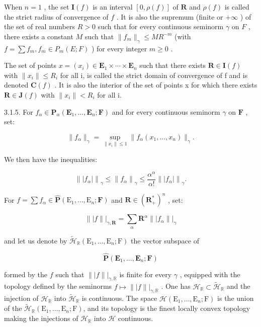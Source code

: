 When \(n=1\) , the set \(\mathbf{I}(f)\) is an interval \([0,\rho(f)]\) of \(\mathbf{R}\) and \(\rho(f)\) is called the strict radius of convergence of \(f\) . It is also the supremum (finite or \(+\infty\) ) of the set of real numbers \(R>0\) such that for every continuous seminorm \(\gamma\) on \(F\) , there exists a constant \(M\) such that \(\|f_{m}\|_{\gamma}\leqslant MR^{-m}\) (with \(f=\sum f_{m},f_{m}\in P_{m}(E;F)\) ) for every integer \(m\geqslant0\) .

The set of points \(x = (x_i) \in \mathbf{E}_1 \times \cdots \times \mathbf{E}_n\) such that there exists \(\mathbf{R} \in \mathbf{I}(f)\) with \(\|x_i\| \leqslant R_i\) for all i, is called the strict domain of convergence of f and is denoted \(\mathbf{C}(f)\) . It is also the interior of the set of points x for which there exists \(\mathbf{R} \in \mathbf{J}(f)\) with \(\|x_i\| < R_i\) for all i.

3.1.5. For \(f_{\alpha} \in \mathbf{P}_{\alpha}(\mathbf{E}_1, \ldots, \mathbf{E}_n; \mathbf{F})\) and for every continuous seminorm \(\gamma\) on \(\mathbf{F}\) , set:

\[
\| f _ {\alpha} \| _ {\gamma} = \sup _ {\| x _ {i} \| \leqslant 1} \| f _ {\alpha} (x _ {1}, \dots , x _ {n}) \| _ {\gamma}.
\]

We then have the inequalities:

\[
\left\| \left| f _ {\alpha} \right| \right\| _ {\gamma} \leqslant \left\| f _ {\alpha} \right\| _ {\gamma} \leqslant \frac {\alpha^ {\alpha}}{\alpha !} \left\| \left| f _ {\alpha} \right| \right\| _ {\gamma}.
\]

For \(f = \sum f_{\alpha} \in \hat{\mathbf{P}}(\mathrm{E}_1, \ldots, \mathrm{E}_n; \mathbf{F})\) and \(\mathbf{R} \in (\mathbf{R}_{+}^{*})^n\) , set:

\[
\| | f \| | _ {\gamma , \mathbf {R}} = \sum_ {\alpha} \mathbf {R} ^ {\alpha} \| | f _ {\alpha} \| | _ {\gamma}
\]

and let us denote by \(\tilde{\mathcal{H}}_{\mathbb{R}}(\mathrm{E}_{1},\ldots ,\mathrm{E}_{n};\mathrm{F})\) the vector subspace of

\[
\hat {\mathbf {P}} (\mathbf {E} _ {1}, \dots , \mathbf {E} _ {n}; \mathbf {F})
\]

formed by the \(f\) such that \(\| | f \| | _ {\gamma,\mathbb{R}}\) is finite for every \(\gamma\) , equipped with the topology defined by the seminorms \(f\mapsto\| | f \| | _ {\gamma,\mathbb{R}}\) . One has \(\mathcal{H}_{\mathbb{R}}\subset\tilde{\mathcal{H}}_{\mathbb{R}}\) and the injection of \(\mathcal{H}_{\mathbb{R}}\) into \(\tilde{\mathcal{H}}_{\mathbb{R}}\) is continuous. The space \(\mathcal{H}(\mathrm{E}_{1},\ldots,\mathrm{E}_{n};\mathrm{F})\) is the union of the \(\tilde{\mathcal{H}}_{\mathbb{R}}(\mathrm{E}_{1},\ldots,\mathrm{E}_{n};\mathrm{F})\), and its topology is the finest locally convex topology making the injections of \(\mathcal{H}_{\mathbb{R}}\) into \(\mathcal{H}\) continuous.

